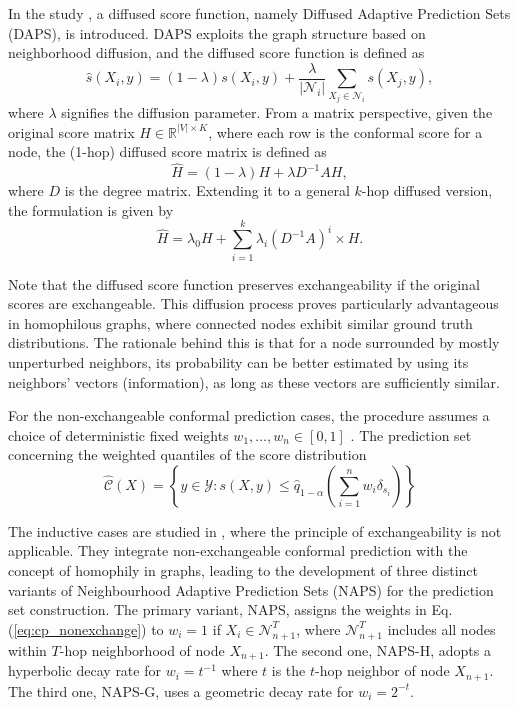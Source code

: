 In the study \cite{zargarbashi2023conformal},
a diffused score function, 
namely Diffused Adaptive Prediction Sets (DAPS), 
is introduced. 
DAPS exploits the graph structure based on neighborhood diffusion,
and the diffused score function is defined as
\begin{equation}
    \hat{s}(X_i,y)=(1-\lambda)s(X_i,y) + \frac{\lambda}{|\mathcal{N}_i|} \sum_{X_j\in\mathcal{N}_i} s(X_j, y),
\end{equation}
where $\lambda$ signifies the diffusion parameter. 
From a matrix perspective, 
given the original score matrix $H\in\mathbb{R}^{|V|\times K}$, 
where each row is the conformal score for a node, 
the (1-hop) diffused score matrix is defined as 
\begin{equation}
    \hat{H} = (1-\lambda)H + \lambda D^{-1}AH,
\end{equation}
where $D$ is the degree matrix.
Extending it to a general $k$-hop diffused version,
the formulation is given by 
\begin{equation}
    \hat{H}=\lambda_0 H + \sum_{i=1}^k \lambda_i(D^{-1}A)^i \times H.
\end{equation}

Note that the diffused score function preserves exchangeability if the original scores are exchangeable. 
This diffusion process proves particularly advantageous in homophilous graphs, 
where connected nodes exhibit similar ground truth distributions. 
% 
The rationale behind this is that for a node surrounded by mostly unperturbed neighbors, 
its probability can be better estimated by using its neighbors' vectors (information), as long as these vectors are sufficiently similar.

For the non-exchangeable conformal prediction cases,
the procedure assumes a choice of deterministic fixed weights $w_1,\dots,w_n \in [0,1]$ \cite{barber2023conformal}.
The prediction set concerning the weighted 
quantiles of the score distribution 
\begin{equation}
\label{eq:cp_nonexchange}
    \hat{\mathcal{C}}(X) = \left\{ y\in\mathcal{Y}: s(X,y)\leq  \hat{q}_{1-\alpha} \left( \sum_{i=1}^n w_i \delta_{s_i}
    \right) \right\}
\end{equation}

The inductive cases are studied in \cite{clarkson2023distribution},
where the principle of exchangeability is not applicable.
They integrate non-exchangeable conformal prediction with the concept of homophily in graphs, 
leading to the development of three distinct variants of Neighbourhood Adaptive Prediction Sets (NAPS) for the prediction set construction.
The primary variant, NAPS, assigns the weights in Eq. (\ref{eq:cp_nonexchange}) to
$w_i=1$ if $X_i \in \mathcal{N}_{n+1}^T $, where $\mathcal{N}_{n+1}^T$ includes all nodes within $T$-hop neighborhood of node $X_{n+1}$. 
The second one, NAPS-H, adopts a hyperbolic decay rate for $w_i=t^{-1}$ where $t$ is the $t$-hop neighbor of node $X_{n+1}$.
The third one, NAPS-G, uses a geometric decay rate for $w_i=2^{-t}$.
